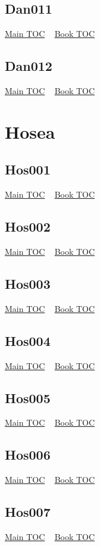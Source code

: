\documentclass{book}
\begin{document}
  \section{Dan011}\hyperlink{toc}{Main TOC} ~ \hyperref[subsec:Dan]{Book TOC} 
  \section{Dan012}\hyperlink{toc}{Main TOC} ~ \hyperref[subsec:Dan]{Book TOC} 
  \chapter{Hosea} \label{subsec:Hos} \begin{multicols}{2} \minitoc \end{multicols}
  \section{Hos001}\hyperlink{toc}{Main TOC} ~ \hyperref[subsec:Hos]{Book TOC} 
  \section{Hos002}\hyperlink{toc}{Main TOC} ~ \hyperref[subsec:Hos]{Book TOC} 
  \section{Hos003}\hyperlink{toc}{Main TOC} ~ \hyperref[subsec:Hos]{Book TOC} 
  \section{Hos004}\hyperlink{toc}{Main TOC} ~ \hyperref[subsec:Hos]{Book TOC} 
  \section{Hos005}\hyperlink{toc}{Main TOC} ~ \hyperref[subsec:Hos]{Book TOC} 
  \section{Hos006}\hyperlink{toc}{Main TOC} ~ \hyperref[subsec:Hos]{Book TOC} 
  \section{Hos007}\hyperlink{toc}{Main TOC} ~ \hyperref[subsec:Hos]{Book TOC} 
\end{document}

